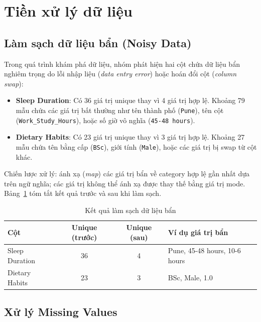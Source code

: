 \section{Tiền xử lý dữ liệu}
\label{sec:preprocessing}

\subsection{Làm sạch dữ liệu bẩn (Noisy Data)}
\label{subsec:noisy_data}

Trong quá trình khám phá dữ liệu, nhóm phát hiện hai cột chứa dữ liệu bẩn nghiêm trọng do lỗi nhập liệu (\textit{data entry error}) hoặc hoán đổi cột (\textit{column swap}):

\begin{itemize}[noitemsep]
    \item \textbf{Sleep Duration}: Có 36 giá trị unique thay vì 4 giá trị hợp lệ. Khoảng 79 mẫu chứa các giá trị bất thường như tên thành phố (\texttt{Pune}), tên cột (\texttt{Work\_Study\_Hours}), hoặc số giờ vô nghĩa (\texttt{45-48 hours}).
    \item \textbf{Dietary Habits}: Có 23 giá trị unique thay vì 3 giá trị hợp lệ. Khoảng 27 mẫu chứa tên bằng cấp (\texttt{BSc}), giới tính (\texttt{Male}), hoặc các giá trị bị swap từ cột khác.
\end{itemize}

Chiến lược xử lý: ánh xạ (\textit{map}) các giá trị bẩn về category hợp lệ gần nhất dựa trên ngữ nghĩa; các giá trị không thể ánh xạ được thay thế bằng giá trị mode. Bảng~\ref{tab:noisy_data} tóm tắt kết quả trước và sau khi làm sạch.

\begin{table}[H]
\centering
\caption{Kết quả làm sạch dữ liệu bẩn}
\label{tab:noisy_data}
\begin{tabular}{lccl}
\toprule
\textbf{Cột} & \textbf{Unique (trước)} & \textbf{Unique (sau)} & \textbf{Ví dụ giá trị bẩn} \\
\midrule
Sleep Duration & 36 & 4 & Pune, 45-48 hours, 10-6 hours \\
Dietary Habits & 23 & 3 & BSc, Male, 1.0 \\
\bottomrule
\end{tabular}
\end{table}

\subsection{Xử lý Missing Values}
\label{subsec:missing_values}

